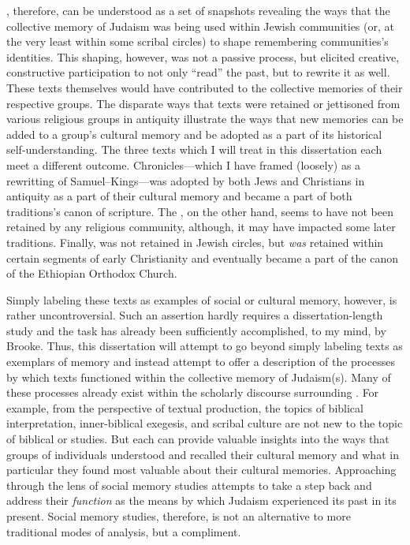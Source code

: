 \RwB, therefore, can be understood as a set of snapshots
revealing the ways that the collective memory of \secondtemple
Judaism was being used within Jewish communities (or, at the very least
within some scribal circles) to shape remembering communities's
identities. This shaping, however, was not a passive process, but
elicited creative, constructive participation to not only ``read'' the
past, but to rewrite it as well. These texts themselves would have
contributed to the collective memories of their respective groups. The
disparate ways that \rwb texts were retained or
jettisoned from various religious groups in antiquity illustrate the
ways that new memories can be added to a group's cultural memory and be
adopted as a part of its historical self-understanding. The three texts
which I will treat in this dissertation each meet a different outcome.
Chronicles---which I have framed (loosely) as a rewritting of
Samuel--Kings---was adopted by both Jews and Christians in antiquity as
a part of their cultural memory and became a part of both traditions's
canon of scripture. The \ga, on the other hand, seems to
have not been retained by any religious community, although, it may have
impacted some later traditions. Finally, \jub was not
retained in Jewish circles, but \emph{was} retained within certain
segments of early Christianity and eventually became a part of the canon
of the Ethiopian Orthodox Church.

Simply labeling these \rwb texts as examples of social
or cultural memory, however, is rather uncontroversial. Such an
assertion hardly requires a dissertation-length study and the task has
already been sufficiently accomplished, to my mind, by
Brooke.\autocite{brooke_zsengeller2014} Thus, this dissertation will
attempt to go beyond simply labeling \rwb texts as
exemplars of memory and instead attempt to offer a description of the
processes by which \rwb texts functioned within the
collective memory of \secondtemple Judaism(s). Many of these
processes already exist within the scholarly discourse surrounding
\rwb. For example, from the perspective of textual
production, the topics of biblical interpretation, inner-biblical
exegesis, and scribal culture are not new to the topic of biblical or
\qumran studies. But each can provide valuable insights
into the ways that groups of individuals understood and recalled their
cultural memory and what in particular they found most valuable about
their cultural memories. Approaching \rwb through the
lens of social memory studies attempts to take a step back and address
their \emph{function} as the means by which \secondtemple Judaism
experienced its past in its present. Social memory studies, therefore,
is not an alternative to more traditional modes of analysis, but a
compliment.

